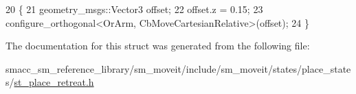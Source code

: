\begin{DoxyCode}
20     \{
21         geometry\_msgs::Vector3 offset;
22         offset.z = 0.15;
23         configure\_orthogonal<OrArm, CbMoveCartesianRelative>(offset);
24     \}
\end{DoxyCode}


The documentation for this struct was generated from the following file\+:\begin{DoxyCompactItemize}
\item 
smacc\+\_\+sm\+\_\+reference\+\_\+library/sm\+\_\+moveit/include/sm\+\_\+moveit/states/place\+\_\+states/\hyperlink{st__place__retreat_8h}{st\+\_\+place\+\_\+retreat.\+h}\end{DoxyCompactItemize}
